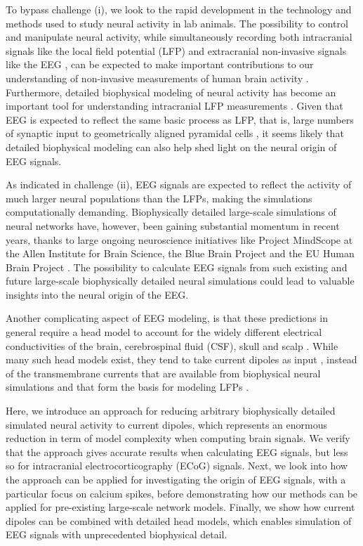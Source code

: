 \documentclass[preprint,10pt,authoryear]{elsarticle}
\newcommand{\hlp}[2][Purple]{ {\sethlcolor{#1} \hl{#2}} }
\newcommand{\gen}[1]{\color{white}{\hlp{GTE: #1 }}\color{black}}
\begin{document}
To bypass challenge (i), we look to the rapid development in the technology and methods used to study neural activity in lab animals. The possibility to control and manipulate neural activity, while simultaneously recording both intracranial signals like the local field potential (LFP) \citep{Einevoll2007, Blomquist2009} and extracranial non-invasive signals like the EEG \citep{BRUYNS2017}, can be expected to make important contributions to our understanding of non-invasive measurements of human brain activity \citep{SILVA2013, Uhlirova2016, COHEN2017, Pesaran2018}. 
Furthermore, detailed biophysical modeling of neural activity has become an important tool for understanding intracranial LFP measurements \citep{EINEVOLL2013REVIEW, Pesaran2018}. Given that EEG is expected to reflect the same basic process as LFP, that is, large numbers of synaptic input to geometrically aligned pyramidal cells \citep{NUNEZ2006, Pesaran2018, BUZSAKI2012}, 
it seems likely that detailed biophysical modeling can also help shed light on the neural origin of EEG signals.

As indicated in challenge (ii), EEG signals are expected to reflect the activity of much larger neural populations than the LFPs, making the simulations computationally demanding. Biophysically detailed large-scale simulations of neural networks have, however, been gaining substantial momentum in recent years, thanks to large ongoing neuroscience initiatives like Project MindScope at the Allen Institute for Brain Science, the Blue Brain Project
and the EU Human Brain Project \citep{EINEVOLL2019}. The possibility to calculate EEG signals from such existing and future large-scale biophysically detailed neural simulations could lead to valuable insights into the neural origin of the EEG.

Another complicating aspect of EEG modeling, is that these predictions in general require a head model to account for the widely different electrical conductivities of the brain, cerebrospinal fluid (CSF), skull and scalp \citep{NUNEZ2006, Ilmoniemi2019}. While many such head models exist, they tend to take current dipoles as input \citep{NUNEZ2006, Pesaran2018}, instead of the transmembrane currents that are available from biophysical neural simulations and that form the basis for modeling LFPs \citep{EINEVOLL2013BOOKCHAPTER}. 

Here, we introduce an approach for reducing arbitrary biophysically detailed simulated neural activity to current dipoles, which represents an enormous reduction in term of model complexity when computing brain signals. We verify that the approach gives accurate results when calculating EEG signals, but less so for intracranial electrocorticography (ECoG) signals. Next, we look into how the approach can be applied for investigating the origin of EEG signals, with a particular focus on calcium spikes, before demonstrating how our methods can be applied for pre-existing large-scale network models. Finally, we show how current dipoles can be combined with detailed head models, which enables simulation of EEG signals with unprecedented biophysical detail.  
\end{document}
